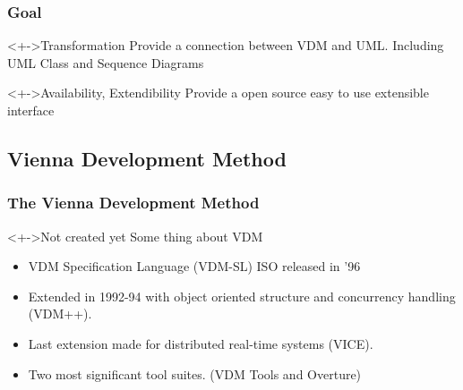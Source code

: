 %
%
\frame
{
  \frametitle{Goal}

\begin{center}

	\begin{block}<+->{Transformation}
	Provide a connection between VDM and UML. Including UML Class and Sequence Diagrams
	\end{block}

	\begin{block}<+->{Availability, Extendibility}
	Provide a open source easy to use extensible interface
	\end{block}
%	  	
\end{center}
}


\subsection{Vienna Development Method}
%
%
\frame
{
  \frametitle{The Vienna Development Method}

\begin{center}
	\begin{block}<+->{Not created yet}
	Some thing about VDM
	\end{block}
  \begin{itemize}
  		\item VDM Specification Language (VDM-SL) ISO released in '96
  		\item Extended in 1992-94 with object oriented structure and concurrency handling (VDM++).
  		\item Last extension made for distributed real-time systems (VICE).
  		\item Two most significant tool suites. (VDM Tools and Overture)
	  	
  \end{itemize}

\end{center}
}

